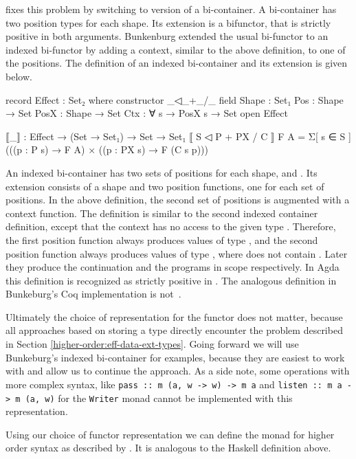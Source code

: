 \textcite{bunkenburg2019modeling} fixes this problem by switching to version of
a bi-container.
A bi-container has two position types for each shape.
Its extension is a bifunctor, that is strictly positive in both arguments.
Bunkenburg extended the usual bi-functor to an indexed bi-functor by adding a
context, similar to the above definition, to one of the positions.
The definition of an indexed bi-container and its extension is given below.

\begin{code}
record Effect : Set₂ where
  constructor _◁_+_/_
  field
    Shape : Set₁
    Pos : Shape → Set
    PosX : Shape → Set
    Ctx : ∀ s → PosX s → Set
open Effect

⟦_⟧ : Effect → (Set → Set₁) → Set → Set₁
⟦ S ◁ P + PX / C ⟧ F A = Σ[ s ∈ S ] (((p : P s) → F A) × ((p : PX s) → F (C s p)))
\end{code}
An indexed bi-container has two sets of positions for each shape, 
and .
Its extension consists of a shape and two position functions, one for each set
of positions.
In the above definition, the second set of positions is augmented with a context
function.
The definition is similar to the second indexed container definition, except
that the context has no access to the given type .
Therefore, the first position function always produces values of type
, and the second position function always produces values of
type , where  does not contain
.
Later they produce the continuation and the programs in scope respectively.
In Agda this definition is recognized as strictly positive in .
The analogous definition in Bunkeburg's Coq implementation is
not~\cite{bunkenburg2019modeling}.
 
Ultimately the choice of representation for the functor does not matter, because
all approaches based on storing a type directly encounter the problem described
in Section \ref{higher-order:eff-data-ext-types}.
Going forward we will use Bunkeburg's indexed bi-container for examples, because
they are easiest to work with and allow us to continue the approach.
As a side note, some operations with more complex syntax, like \texttt{pass :: m
(a, w -> w) -> m a} and \texttt{listen :: m a -> m (a, w)} for the
\texttt{Writer} monad cannot be implemented with this representation.
 
Using our choice of functor representation we can define the 
monad for higher order syntax as described by
\textcite{DBLP:conf/haskell/WuSH14}.
It is analogous to the Haskell definition above.

